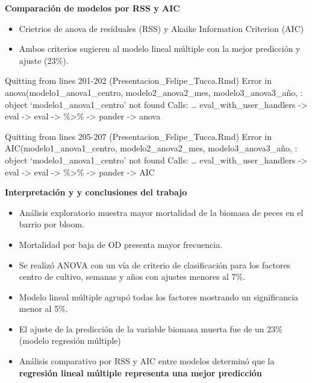 \documentclass[
  ignorenonframetext,
]{beamer}
\begin{document}
\begin{frame}{\textbf{Comparación de modelos por RSS y AIC}}
\protect\hypertarget{comparaciuxf3n-de-modelos-por-rss-y-aic}{}
\begin{itemize}
\item
  Crietrios de anova de residuales (RSS) y Akaike Information Criterion
  (AIC)
\item
  Ambos criterios sugieren al modelo lineal múltiple con la mejor
  predicción y ajuste (23\%).
\end{itemize}

Quitting from lines 201-202 (Presentacion\_Felipe\_Tucca.Rmd) Error in
anova(modelo1\_anova1\_centro, modelo2\_anova2\_mes,
modelo3\_anova3\_año, : object `modelo1\_anova1\_centro' not found
Calls: \ldots{} eval\_with\_user\_handlers -\textgreater{} eval
-\textgreater{} eval -\textgreater{} \%\textgreater\% -\textgreater{}
pander -\textgreater{} anova

Quitting from lines 205-207 (Presentacion\_Felipe\_Tucca.Rmd) Error in
AIC(modelo1\_anova1\_centro, modelo2\_anova2\_mes, modelo3\_anova3\_año,
: object `modelo1\_anova1\_centro' not found Calls: \ldots{}
eval\_with\_user\_handlers -\textgreater{} eval -\textgreater{} eval
-\textgreater{} \%\textgreater\% -\textgreater{} pander -\textgreater{}
AIC
\end{frame}

\begin{frame}{\textbf{Interpretación y y conclusiones del trabajo}}
\protect\hypertarget{interpretaciuxf3n-y-y-conclusiones-del-trabajo}{}
\begin{itemize}
\item
  Análisis exploratorio muestra mayor mortalidad de la biomasa de peces
  en el barrio por bloom.
\item
  Mortalidad por baja de OD presenta mayor frecuencia.
\item
  Se realizó ANOVA con un vía de criterio de clasificación para los
  factores centro de cultivo, semanas y años con ajustes menores al 7\%.
\item
  Modelo lineal múltiple agrupó todas los factores mostrando un
  significancia menor al 5\%.
\item
  El ajuste de la predicción de la variable biomasa muerta fue de un
  23\% (modelo regresión múltiple)
\item
  Análisis comparativo por RSS y AIC entre modelos determinó que la
  \textbf{regresión lineal múltiple representa una mejor predicción}
\end{itemize}
\end{frame}
\end{document}
